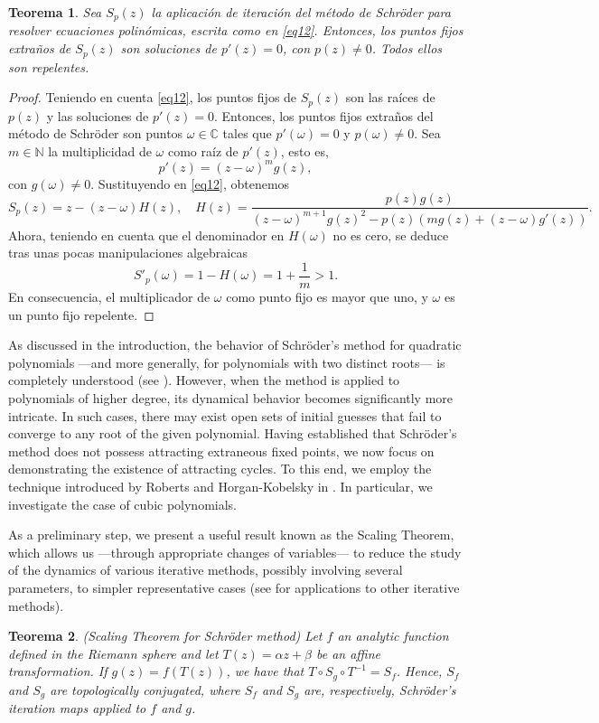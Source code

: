 \IfFileExists{aims.cls}{\documentclass{aims}}{\documentclass[11pt]{article}}
\numberwithin{equation}{section}
\theoremstyle{thmstyleone}%
\newtheorem{theorem}{Teorema}%
\theoremstyle{thmstyletwo}%
\theoremstyle{thmstylethree}%
\begin{document}
\begin{theorem}
Sea $S_p(z)$ la aplicación de iteración del método de Schr\"oder para resolver ecuaciones polinómicas, escrita como en \eqref{eq12}. Entonces, los puntos fijos extraños de $S_p(z)$ son soluciones de $p'(z)=0$, con $p(z)\ne0$. Todos ellos son repelentes.
\end{theorem}


\begin{proof}  Teniendo en cuenta \eqref{eq12}, los puntos fijos de $S_p(z)$ son las raíces de $p(z)$ y las soluciones de $p'(z)=0$. Entonces, los puntos fijos extraños del método de Schr\"oder son puntos $\omega\in\mathbb{C}$ tales que $p'(\omega)=0$ y $p(\omega)\ne 0$. Sea $m\in \mathbb{N}$ la multiplicidad de $\omega$ como raíz de $p'(z)$, esto es,
$$
p'(z)=(z-\omega)^m g(z),
$$
con $g(\omega)\ne 0$. Sustituyendo en \eqref{eq12}, obtenemos 
$$
S_p(z)=z -(z-\omega)H(z), \quad H(z)=\frac{p(z)g(z)}{(z-\omega)^{m+1}g(z)^2-p(z)(mg(z)+(z-\omega)g'(z))}.
$$
Ahora, teniendo en cuenta que el denominador en $H(\omega)$ no es cero, se deduce tras unas pocas manipulaciones algebraicas
$$
S'_{p}(\omega)=1-H(\omega)=1 +\frac{1}{m} >1.
$$
En consecuencia, el multiplicador de $\omega$ como punto fijo es mayor que uno, y $\omega$ es un punto fijo repelente.
\end{proof}

As discussed in the introduction, the behavior of Schröder's method for quadratic polynomials ---and more generally, for polynomials with two distinct roots--- is completely understood (see \cite{11Gali}). However, when the method is applied to polynomials of higher degree, its dynamical behavior becomes significantly more intricate. In such cases, there may exist open sets of initial guesses that fail to converge to any root of the given polynomial. Having established that Schröder's method does not possess attracting extraneous fixed points, we now focus on demonstrating the existence of attracting cycles. To this end, we employ the technique introduced by Roberts and Horgan-Kobelsky in \cite{4Roberts}. In particular, we investigate the case of cubic polynomials.

As a preliminary step, we present a useful result known as the Scaling Theorem, which allows us ---through appropriate changes of variables--- to reduce the study of the dynamics of various iterative methods, possibly involving several parameters, to simpler representative cases (see \cite{12ABP} for applications to other iterative methods).

\begin{theorem} {(Scaling Theorem for Schröder method)} Let $f$ an analytic function defined in the Riemann sphere and let $T(z)=\alpha z+\beta$ be an affine transformation. If $g(z)=f(T(z))$, we have that $T\circ S_g \circ T^{-1}=S_f$. Hence, $S_f$ and $S_g$ are topologically conjugated, where $S_f$ and $S_g$ are, respectively, Schr\"oder's iteration maps applied to $f$ and $g$.
\end{theorem}
\end{document}
